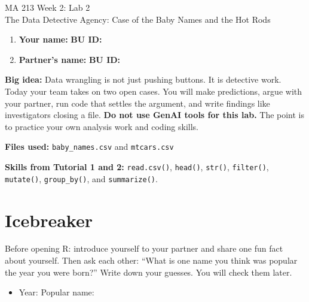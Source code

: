 \documentclass[11pt]{article}
\begin{document}
\begin{center}
  {\LARGE MA 213 Week 2: Lab 2}\\[3pt]
  {\large The Data Detective Agency: Case of the Baby Names and the Hot Rods}
\end{center}

\begin{enumerate}
  \item \textbf{Your name:} \underline{\hspace{0.3\textwidth}} \hfill \textbf{BU ID:} \underline{\hspace{0.25\textwidth}}
  \item \textbf{Partner's name:} \underline{\hspace{0.3\textwidth}} \hfill \textbf{BU ID:} \underline{\hspace{0.25\textwidth}}
\end{enumerate}

\textbf{Big idea:} Data wrangling is not just pushing buttons. It is detective work. Today your team takes on two open cases. You will make predictions, argue with your partner, run code that settles the argument, and write findings like investigators closing a file. 
\textbf{Do not use GenAI tools for this lab.} The point is to practice your own analysis work and coding skills. 

\textbf{Files used:} \texttt{baby\_names.csv} and \texttt{mtcars.csv}

\textbf{Skills from Tutorial 1 and 2:} \texttt{read.csv()}, \texttt{head()}, \texttt{str()}, \texttt{filter()}, \texttt{mutate()}, \texttt{group\_by()}, and \texttt{summarize()}.



\section*{Icebreaker}

Before opening R: introduce yourself to your partner and share one fun fact about yourself. Then ask each other: ``What is one name you think was popular the year you were born?'' Write down your guesses. You will check them later.


\begin{itemize}
  \item Year: \underline{\hspace{0.3\textwidth}} \hfill Popular name: \underline{\hspace{0.25\textwidth}}
\end{itemize}
\end{document}
